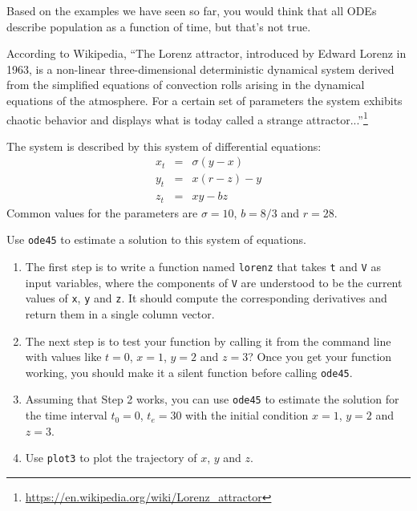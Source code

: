 \documentclass{book}
\begin{document}
\begin{ex}

Based on the examples we have seen so far, you would think that
all ODEs describe population as
a function of time, but that's not true.

According to Wikipedia,
``The Lorenz attractor, introduced by Edward Lorenz in 1963, is a
non-linear three-dimensional deterministic dynamical system derived
from the simplified equations of convection rolls arising in the
dynamical equations of the atmosphere. For a certain set of parameters
the system exhibits chaotic behavior and displays what is today called
a strange attractor...''\footnote{\url{https://en.wikipedia.org/wiki/Lorenz_attractor}}

The system is described by this system of differential equations:
%
\begin{eqnarray}
x_t &=& \sigma (y - x)  \\
y_t &=& x (r - z) - y   \\
z_t &=& xy - b z
\end{eqnarray}
%
Common values for the parameters are $\sigma = 10$, $b = 8/3$ and $r=28$.

Use {\tt ode45} to estimate a solution to this
system of equations.


\begin{enumerate}

\item  The first step is to write a function named {\tt lorenz} that
takes {\tt t} and {\tt V} as input variables, where the components
of {\tt V} are understood to be the current values of {\tt x},
{\tt y} and {\tt z}.  It should compute the corresponding derivatives
and return them in a single column vector.

\item The next step is to test your function by calling it from
the command line with values like
$t=0$, $x=1$, $y=2$ and $z=3$?  Once you get your function working,
you should make it a silent function before calling {\tt ode45}.

\item Assuming that Step 2 works, you can use {\tt ode45}
to estimate the solution for the time interval $t_0 = 0$, $t_e = 30$
with the initial condition $x=1$, $y=2$ and $z=3$.

\item Use {\tt plot3} to plot the trajectory of
$x$, $y$ and $z$.

\end{enumerate}

\end{ex}
\end{document}
